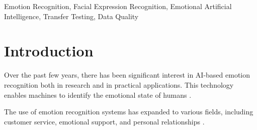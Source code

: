 \documentclass[a4paper, conference]{IEEEtran}
\begin{document}
\begin{IEEEkeywords}
Emotion Recognition, Facial Expression Recognition, Emotional Artificial Intelligence, Transfer Testing, Data Quality
\end{IEEEkeywords}


\section{Introduction}

Over the past few years, there has been significant interest in AI-based emotion recognition both in research and in practical applications. This technology enables machines to identify the emotional state of humans \cite{liDeepFacialExpression2020, melloukFacialEmotionRecognition2020}.


The use of emotion recognition systems has expanded to various fields, including customer service, emotional support, and personal relationships \cite{AffectivaHumanizingTechnology2021,Replika2021,davenportHowArtificialIntelligence2020,davoliDriverBehaviorRecognition2020,huangArtificialIntelligenceService2018}. %
\end{document}
